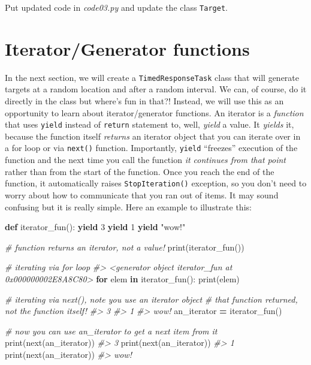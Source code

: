 \documentclass[
]{book}
\newenvironment{Shaded}{\begin{snugshade}}{\end{snugshade}}
\newcommand{\BuiltInTok}[1]{#1}
\newcommand{\CommentTok}[1]{\textcolor[rgb]{0.56,0.35,0.01}{\textit{#1}}}
\newcommand{\ControlFlowTok}[1]{\textcolor[rgb]{0.13,0.29,0.53}{\textbf{#1}}}
\newcommand{\DecValTok}[1]{\textcolor[rgb]{0.00,0.00,0.81}{#1}}
\newcommand{\KeywordTok}[1]{\textcolor[rgb]{0.13,0.29,0.53}{\textbf{#1}}}
\newcommand{\NormalTok}[1]{#1}
\newcommand{\OperatorTok}[1]{\textcolor[rgb]{0.81,0.36,0.00}{\textbf{#1}}}
\newcommand{\StringTok}[1]{\textcolor[rgb]{0.31,0.60,0.02}{#1}}
\begin{document}
Put updated code in \emph{code03.py} and update the class \texttt{Target}.

\hypertarget{iteratorgenerator-functions}{%
\section{Iterator/Generator functions}\label{iteratorgenerator-functions}}

In the next section, we will create a \texttt{TimedResponseTask} class that will generate targets at a random location and after a random interval. We can, of course, do it directly in the class but where's fun in that?! Instead, we will use this as an opportunity to learn about iterator/generator functions. An iterator is a \emph{function} that uses \texttt{yield} instead of \texttt{return} statement to, well, \emph{yield} a value. It \emph{yields} it, because the function itself \emph{returns} an iterator object that you can iterate over in a for loop or via \texttt{next()} function. Importantly, \texttt{yield} ``freezes'' execution of the function and the next time you call the function \emph{it continues from that point} rather than from the start of the function. Once you reach the end of the function, it automatically raises \texttt{StopIteration()} exception, so you don't need to worry about how to communicate that you ran out of items. It may sound confusing but it is really simple. Here an example to illustrate this:

\begin{Shaded}
\begin{Highlighting}[]
\KeywordTok{def}\NormalTok{ iterator\_fun():}
    \ControlFlowTok{yield} \DecValTok{3}
    \ControlFlowTok{yield} \DecValTok{1}
    \ControlFlowTok{yield} \StringTok{"wow!"}
  
\CommentTok{\# function returns an iterator, not a value!}
\BuiltInTok{print}\NormalTok{(iterator\_fun())}

\CommentTok{\# iterating via for loop}
\CommentTok{\#\textgreater{} \textless{}generator object iterator\_fun at 0x000000002E8A8C80\textgreater{}}
\ControlFlowTok{for}\NormalTok{ elem }\KeywordTok{in}\NormalTok{ iterator\_fun():}
    \BuiltInTok{print}\NormalTok{(elem)}
    
\CommentTok{\# iterating via next(), note you use an iterator object }
\CommentTok{\# that function returned, not the function itself!}
\CommentTok{\#\textgreater{} 3}
\CommentTok{\#\textgreater{} 1}
\CommentTok{\#\textgreater{} wow!}
\NormalTok{an\_iterator }\OperatorTok{=}\NormalTok{ iterator\_fun()  }

\CommentTok{\# now you can use an\_iterator to get a next item from it}
\BuiltInTok{print}\NormalTok{(}\BuiltInTok{next}\NormalTok{(an\_iterator))}
\CommentTok{\#\textgreater{} 3}
\BuiltInTok{print}\NormalTok{(}\BuiltInTok{next}\NormalTok{(an\_iterator))}
\CommentTok{\#\textgreater{} 1}
\BuiltInTok{print}\NormalTok{(}\BuiltInTok{next}\NormalTok{(an\_iterator))}
\CommentTok{\#\textgreater{} wow!}
\end{Highlighting}
\end{Shaded}
\end{document}
